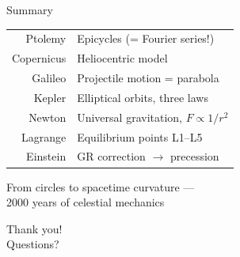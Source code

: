 \documentclass[aspectratio=169, 14pt]{beamer}
\begin{document}
\begin{frame}{Summary}
  \begin{center}
    \renewcommand{\arraystretch}{1.5}
    \begin{tabular}{r@{\quad}l}
      {\color{highlight} Ptolemy}   & Epicycles (= Fourier series!) \\
      {\color{highlight} Copernicus}& Heliocentric model \\
      {\color{highlight} Galileo}   & Projectile motion = parabola \\
      {\color{highlight} Kepler}    & Elliptical orbits, three laws \\
      {\color{highlight} Newton}    & Universal gravitation, $F \propto 1/r^2$ \\
      {\color{highlight} Lagrange}  & Equilibrium points L1--L5 \\
      {\color{highlight} Einstein}  & GR correction $\to$ precession \\
    \end{tabular}
  \end{center}

  \vspace{12pt}
  \begin{center}
    {\color{accent}\large From circles to spacetime curvature ---}\\[4pt]
    {\color{accent}\large 2000 years of celestial mechanics}
  \end{center}
\end{frame}


\begin{frame}[plain]
  \vfill
  \begin{center}
    {\fontsize{48}{48}\selectfont\color{highlight} Thank you!}\\[24pt]
    {\color{dimtext}\Large Questions?}
  \end{center}
  \vfill
\end{frame}
\end{document}
